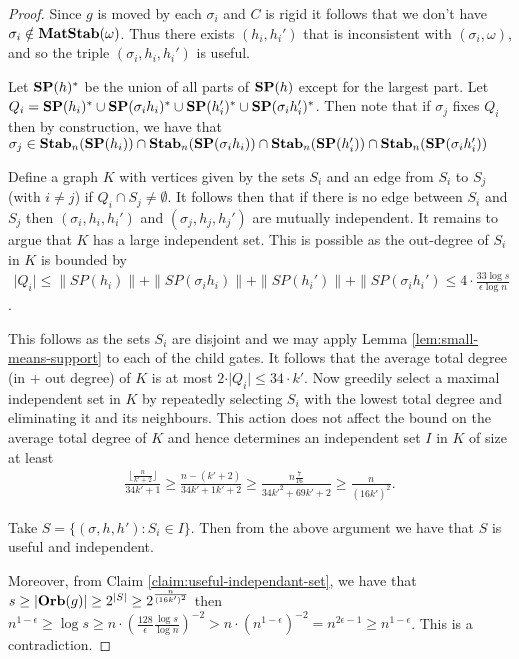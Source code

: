 \documentclass[../paper.tex]{subfiles}
\begin{document}
\begin{proof}
  Since $g$ is moved by each $\sigma_i$ and $C$ is rigid it follows that we
  don't have $\sigma_i \notin \text{\textbf{MatStab}}(\omega)$. Thus there exists $(h_i, h_i')$
  that is inconsistent with $(\sigma_i, \omega)$, and so the triple $(\sigma_i,
  h_i, h_i')$ is useful.

  Let $\text{\textbf{SP}} (h)^*$ be the union of all parts of $\text{\textbf{SP}}(h)$ except for the largest
  part. Let $Q_i = \text{\textbf{SP}}(h_i)^* \cup \text{\textbf{SP}}(\sigma_i h_i)^* \cup \text{\textbf{SP}} (h_i')^* \cup
  \text{\textbf{SP}} (\sigma_i h_i')^*$. Then note that if $\sigma_j$ fixes $Q_i$ then by
  construction, we have that $\sigma_j \in \text{\textbf{Stab}}_n(\text{\textbf{SP}}(h_i)) \cap
  \text{\textbf{Stab}}_n(\text{\textbf{SP}}(\sigma_i h_i)) \cap \text{\textbf{Stab}}_n(\text{\textbf{SP}}(h_i')) \cap \text{\textbf{Stab}}_n(\text{\textbf{SP}}(\sigma_i
  h_i'))$

  Define a graph $K$ with vertices given by the sets $S_i$ and an edge from
  $S_i$ to $S_j$ (with $i \neq j$) if $Q_i \cap S_j \neq \emptyset$. It follows
  then that if there is no edge between $S_i$ and $S_j$ then $(\sigma_i, h_i,
  h_i')$ and $(\sigma_j, h_j, h_j')$ are mutually independent. It remains to
  argue that $K$ has a large independent set. This is possible as the out-degree
  of $S_i$ in $K$ is bounded by
  \begin{align*}
    \vert Q_i \vert \leq \|SP(h_i) \| + \|SP(\sigma_i h_i) \| + \|SP(h_i') \| + \|SP(\sigma_i h_i') \leq 4 \cdot \frac{33\log s}{\epsilon \log n}
  \end{align*}. 

  This follows as the sets $S_i$ are disjoint and we may apply Lemma
  \ref{lem:small-means-support} to each of the child gates. It follows that the
  average total degree (in + out degree) of $K$ is at most $2 \cdot \vert Q_i
  \vert \leq 34 \cdot k'$. Now greedily select a maximal independent set in $K$
  by repeatedly selecting $S_i$ with the lowest total degree and eliminating it
  and its neighbours. This action does not affect the bound on the average total
  degree of $K$ and hence determines an independent set $I$ in $K$ of size at
  least
  \begin{align*}
    \frac{\lfloor \frac{n}{k' + 2} \rfloor}{34k' + 1} \geq \frac{n - (k'+2)}{34k'+1k'+2} \geq \frac{n\frac{7}{16}}{34k'^2 + 69k' +2} \geq \frac{n}{(16k')^2}.
  \end{align*}

  Take $S = \{(\sigma, h, h') : S_i \in I \}$. Then from the above argument we
  have that $S$ is useful and independent.
  
  Moreover, from Claim \ref{claim:useful-independant-set}, we have that $s \geq
  \vert \text{\textbf{Orb}}(g) \vert \geq 2^{\vert S \vert} \geq 2^{\frac{n}{(16k')^2}}$ then
  $n^{1-\epsilon} \geq \log s \geq n \cdot (\frac{128}{\epsilon}\frac{\log
    s}{\log n})^{-2} > n \cdot (n^{1-\epsilon})^{-2} = n^{2\epsilon -1} \geq
  n^{1-\epsilon}$. This is a contradiction.
\end{proof}
\end{document}
